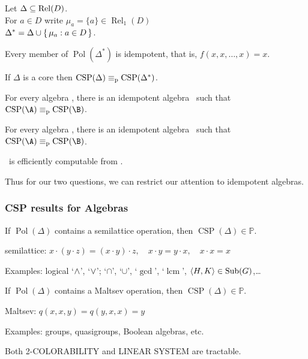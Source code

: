 \documentclass[12pt,xcolor=dvipsnames,handout
   ]{beamer}
\DeclareMathOperator{\Sub}{Sub}
\DeclareMathOperator{\Rel}{Rel}
\newcommand{\bigpause}{\pause\bigskip}
\DeclareMathOperator{\CSP}{CSP}
\DeclareMathOperator{\Pol}{Pol}
\renewcommand{\.}{\cdot}
\newcommand{\equivp}{\equiv_{\text{\textnormal{p}}}}
\renewcommand{\P}{\ensuremath{\mathbb{P}}\xspace}
\let\emph=\alert
\begin{document}
\begin{frame}
Let $\Delta \sseq \Rel(D)$. \\
For $a\in D$ write $\mu_a=\{a\} \in \Rel_1(D)$\\
$\Delta^* = \Delta \cup \left\{\,\mu_a : a\in D\,\right\}$.

Every member of $\Pol(\Delta^*)$ is \emph{idempotent,} that is,
$f(x,x,\dots,x)=x$. 

\bigpause

\begin{theorem} 
  If $\Delta$ is a  core then $\CSP(\Delta) \equivp \CSP(\Delta^*)$.
\end{theorem}

\begin{corollary}
  For every algebra \A, there is an idempotent algebra \B\ such that
  $\CSP(\A) \equivp \CSP(\B)$.
\end{corollary}
\end{frame}

\begin{frame}
  \begin{corollary}
    For every algebra \A, there is an idempotent algebra \B\ such that
    $\CSP(\A) \equivp \CSP(\B)$.
  \end{corollary}

  \B\ is efficiently computable from \A.
  
  Thus for our two questions, we can restrict our attention to idempotent
  algebras.

\end{frame}

\begin{frame}
  \frametitle{CSP results for Algebras}

  \begin{theorem}
    If $\Pol(\Delta)$ contains a semilattice operation, then
    $\CSP(\Delta) \in \P$. 
  \end{theorem}

  semilattice: $x\.(y\.z) = (x\.y)\.z,\quad x\.y = y\.x, \quad x\.x = x$

  \pause
  Examples: logical `$\wedge$', `$\vee$'; `$\cap$', `$\cup$', `$\gcd$',
  `$\operatorname{lcm}$', $\<H,K\>\in \Sub(G)$,\dots

\end{frame}

\begin{frame}
  \begin{theorem}
    If $\Pol(\Delta)$ contains a Maltsev operation, then
    $\CSP(\Delta)\in \P$.
  \end{theorem}

  Maltsev: $q(x,x,y)= q(y,x,x) = y$

  Examples: groups, quasigroups, Boolean algebras, etc.

  \bigpause
  \begin{corollary}
    Both 2-COLORABILITY and LINEAR SYSTEM  are tractable.
  \end{corollary}

\end{frame}
\end{document}
